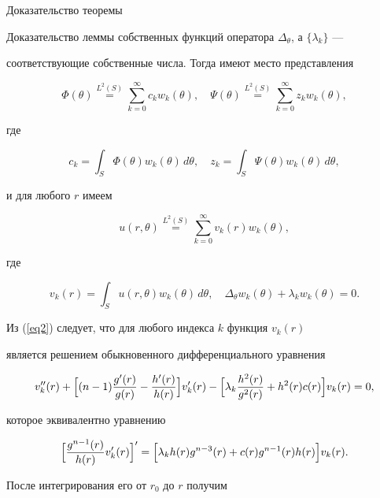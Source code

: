 \begin{pf*}{Доказательство теоремы}
\begin{pf*}{Доказательство леммы}
собственных функций оператора $\Delta_\theta$, а $\{\lambda_k\}$ ---


соответствующие собственные числа. Тогда имеют место представления


$$


\Phi(\theta)\overset{L^2(S)}{=}\sum_{k=0}^\infty c_kw_k(\theta),\quad


\Psi(\theta)\overset{L^2(S)}{=}\sum_{k=0}^\infty z_kw_k(\theta),


$$


где


$$


c_k=\int_S \Phi(\theta)w_k(\theta)\,d\theta,\quad


z_k=\int_S \Psi(\theta)w_k(\theta)\,d\theta,


$$


и для любого $r$ имеем


$$


u(r,\theta)\overset{L^2(S)}{=}\sum_{k=0}^{\infty}v_k(r)w_k(\theta),


$$


где


$$


v_k(r)=\int_S u(r,\theta)w_k(\theta)\,d\theta,\quad


\Delta_\theta w_k(\theta)+\lambda_kw_k(\theta)=0.


$$





Из (\ref{eq2}) следует, что для любого индекса $k$ функция $v_k(r)$


является решением обыкновенного дифференциального уравнения


\begin{equation}


v''_k(r)+\Bigl[(n-1)\frac{g'(r)}{g(r)}-\frac{h'(r)}{h(r)}\Bigr]v'_k(r)


-\Bigl[\lambda_k\frac{h^2(r)}{g^2(r)}+h^2(r)c(r)\Bigr]v_k(r)=0,


\label{eq5}


\end{equation}


которое эквивалентно уравнению


$$


\Bigl[\frac{g^{n-1}(r)}{h(r)}v'_k(r)\Bigr]'=\Bigl[\lambda_k


h(r)g^{n-3}(r)+c(r)g^{n-1}(r)h(r)\Bigr]v_k(r).


$$


После интегрирования его от $r_0$ до $r$ получим



\end{pf*}
\end{pf*}
